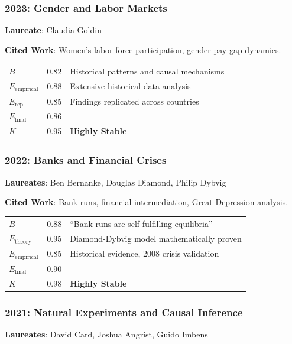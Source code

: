 \documentclass[11pt,a4paper]{article}
\begin{document}
\subsubsection{2023: Gender and Labor Markets}
\textbf{Laureate}: Claudia Goldin

\textbf{Cited Work}: Women's labor force participation, gender pay gap dynamics.

\begin{center}
\begin{tabular}{lcl}
\toprule
$B$ & 0.82 & Historical patterns and causal mechanisms \\
$E_{\text{empirical}}$ & 0.88 & Extensive historical data analysis \\
$E_{\text{rep}}$ & 0.85 & Findings replicated across countries \\
\midrule
$E_{\text{final}}$ & 0.86 & \\
$K$ & 0.95 & \textbf{Highly Stable} \\
\bottomrule
\end{tabular}
\end{center}

\subsubsection{2022: Banks and Financial Crises}
\textbf{Laureates}: Ben Bernanke, Douglas Diamond, Philip Dybvig

\textbf{Cited Work}: Bank runs, financial intermediation, Great Depression analysis.

\begin{center}
\begin{tabular}{lcl}
\toprule
$B$ & 0.88 & ``Bank runs are self-fulfilling equilibria'' \\
$E_{\text{theory}}$ & 0.95 & Diamond-Dybvig model mathematically proven \\
$E_{\text{empirical}}$ & 0.85 & Historical evidence, 2008 crisis validation \\
\midrule
$E_{\text{final}}$ & 0.90 & \\
$K$ & 0.98 & \textbf{Highly Stable} \\
\bottomrule
\end{tabular}
\end{center}

\subsubsection{2021: Natural Experiments and Causal Inference}
\textbf{Laureates}: David Card, Joshua Angrist, Guido Imbens
\end{document}
